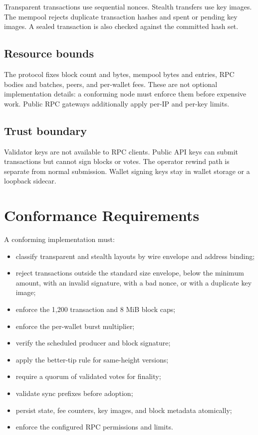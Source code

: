 \documentclass[11pt,a4paper]{article}
\theoremstyle{definition}
\theoremstyle{plain}
\begin{document}
Transparent transactions use sequential nonces. Stealth transfers use key
images. The mempool rejects duplicate transaction hashes and spent or pending
key images. A sealed transaction is also checked against the committed hash
set.

\subsection{Resource bounds}

The protocol fixes block count and bytes, mempool bytes and entries, RPC
bodies and batches, peers, and per-wallet fees. These are not optional
implementation details: a conforming node must enforce them before expensive
work. Public RPC gateways additionally apply per-IP and per-key limits.

\subsection{Trust boundary}

Validator keys are not available to RPC clients. Public API keys can submit
transactions but cannot sign blocks or votes. The operator rewind path is
separate from normal submission. Wallet signing keys stay in wallet storage or
a loopback sidecar.

\section{Conformance Requirements}

A conforming implementation must:

\begin{itemize}[leftmargin=*]
  \item classify transparent and stealth layouts by wire envelope and address
        binding;
  \item reject transactions outside the standard size envelope, below the
        minimum amount, with an invalid signature, with a bad nonce, or with a
        duplicate key image;
  \item enforce the 1,200 transaction and 8 MiB block caps;
  \item enforce the per-wallet burst multiplier;
  \item verify the scheduled producer and block signature;
  \item apply the better-tip rule for same-height versions;
  \item require a quorum of validated votes for finality;
  \item validate sync prefixes before adoption;
  \item persist state, fee counters, key images, and block metadata
        atomically;
  \item enforce the configured RPC permissions and limits.
\end{itemize}
\end{document}
